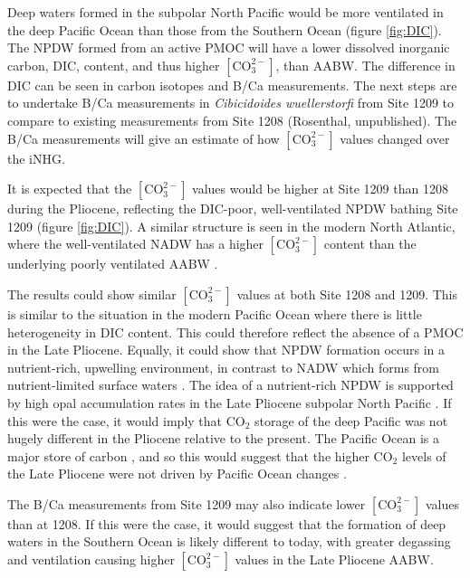 Deep waters formed in the subpolar North Pacific would be more ventilated in the deep Pacific Ocean than those from the Southern Ocean (figure \ref{fig:DIC}). The NPDW formed from an active PMOC will have a lower dissolved inorganic carbon, DIC, content, and thus higher $\left[ \text{CO}_3^{2-}\right]$, than AABW. The difference in DIC can be seen in carbon isotopes \citep{fordSustainedMidPlioceneWarmth2022} and B/Ca measurements. The next steps are to undertake B/Ca measurements in \emph{Cibicidoides wuellerstorfi} from Site 1209 to compare to existing measurements from Site 1208 (Rosenthal, unpublished). The B/Ca measurements will give an estimate of how $\left[\text{CO}_3^{2-}\right]$ values changed over the iNHG. 

It is expected that the $\left[ \text{CO}_3^{2-}\right]$ values would be higher at Site 1209 than 1208 during the Pliocene, reflecting the DIC-poor, well-ventilated NPDW bathing Site 1209 (figure \ref{fig:DIC}). A similar structure is seen in the modern North Atlantic, where the well-ventilated NADW has a higher $\left[ \text{CO}_3^{2-}\right]$ content than the underlying poorly ventilated AABW \citep{chalkDynamicStorageGlacial2019}. 

The results could show similar $\left[ \text{CO}_3^{2-}\right]$ values at both Site 1208 and 1209. This is similar to the situation in the modern Pacific Ocean where there is little heterogeneity in DIC content. This could therefore reflect the absence of a PMOC in the Late Pliocene. Equally, it could show that NPDW formation occurs in a nutrient-rich, upwelling environment, in contrast to NADW which forms from nutrient-limited surface waters \citep{skinnerAtlanticOceanVentilation2020}. The idea of a nutrient-rich NPDW is supported by high opal accumulation rates in the Late Pliocene subpolar North Pacific \citep{haugNorthPacificSeasonality2005,swannSalinityChangesNorth2010}. If this were the case, it would imply that CO$_2$ storage of the deep Pacific was not hugely different in the Pliocene relative to the present. The Pacific Ocean is a major store of carbon \citep{chengImprovedEstimatesOcean2017}, and so this would suggest that the higher CO$_2$ levels of the Late Pliocene were not driven by Pacific Ocean changes \citep{bartoliAtmosphericCO2Decline2011}. 

The B/Ca measurements from Site 1209 may also indicate lower $\left[ \text{CO}_3^{2-}\right]$ values than at 1208. If this were the case, it would suggest that the formation of deep waters in the Southern Ocean is likely different to today, with greater degassing and ventilation causing higher $\left[ \text{CO}_3^{2-}\right]$ values in the Late Pliocene AABW.

